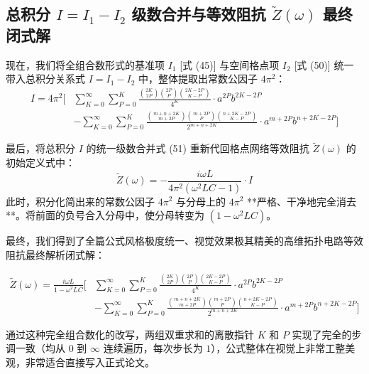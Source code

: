 \documentclass[11pt,a4paper]{ctexart}
\begin{document}
\subsection{总积分 $I = I_1 - I_2$ 级数合并与等效阻抗 $\tilde{Z}(\omega)$ 最终闭式解}
现在，我们将全组合数形式的基准项 $I_1$ [式 (45)] 与空间格点项 $I_2$ [式 (50)] 统一带入总积分关系式 $I = I_1 - I_2$ 中，整体提取出常数公因子 $4\pi^2$：
\begin{align}
I = 4\pi^2 \Bigg[ &\sum_{K=0}^{\infty} \sum_{P=0}^{K} \frac{\binom{2K}{2P} \binom{2P}{P} \binom{2K-2P}{K-P}}{4^K} \cdot a^{2P} b^{2K-2P} \nonumber \\
&- \sum_{K=0}^{\infty} \sum_{P=0}^{K} \frac{\binom{m+n+2K}{m+2P} \binom{m+2P}{P} \binom{n+2K-2P}{K-P}}{2^{m+n+2K}} \cdot a^{m+2P} b^{n+2K-2P} \Bigg]
\end{align}

最后，将总积分 $I$ 的统一级数合并式 (51) 重新代回格点网络等效阻抗 $\tilde{Z}(\omega)$ 的初始定义式中：
\begin{equation}
\tilde{Z}(\omega) = -\frac{i\omega L}{4\pi^2 (\omega^2LC - 1)} \cdot I
\end{equation}
此时，积分化简出来的常数公因子 $4\pi^2$ 与分母上的 $4\pi^2$ **严格、干净地完全消去**。将前面的负号合入分母中，使分母转变为 $(1 - \omega^2LC)$。

最终，我们得到了全篇公式风格极度统一、视觉效果极其精美的高维拓扑电路等效阻抗最终解析闭式解：

\begin{align}
\tilde{Z}(\omega) = \frac{i\omega L}{1 - \omega^2LC} \Bigg[ &\sum_{K=0}^{\infty} \sum_{P=0}^{K} \frac{\binom{2K}{2P} \binom{2P}{P} \binom{2K-2P}{K-P}}{4^K} \cdot a^{2P} b^{2K-2P} \nonumber \\
&- \sum_{K=0}^{\infty} \sum_{P=0}^{K} \frac{\binom{m+n+2K}{m+2P} \binom{m+2P}{P} \binom{n+2K-2P}{K-P}}{2^{m+n+2K}} \cdot a^{m+2P} b^{n+2K-2P} \Bigg]
\end{align}


通过这种完全组合数化的改写，两组双重求和的离散指针 $K$ 和 $P$ 实现了完全的步调一致（均从 $0$ 到 $\infty$ 连续遍历，每次步长为 $1$），公式整体在视觉上非常工整美观，非常适合直接写入正式论文。
\end{document}
